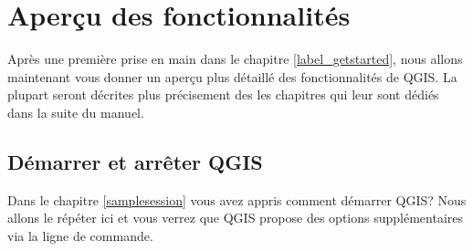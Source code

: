 
\section{Aperçu des fonctionnalités}\label{feature_glance}



Après une première prise en main dans le chapitre \ref{label_getstarted}, nous allons maintenant vous donner un aperçu plus détaillé des fonctionnalités de QGIS. La plupart seront décrites plus précisement des les chapitres qui leur sont dédiés dans la suite du manuel.

%

\subsection{Démarrer et arrêter QGIS}\label{label_startinqgis}

Dans le chapitre \ref{samplesession} vous avez appris comment démarrer QGIS? Nous allons le répéter ici et vous verrez que QGIS propose des options supplémentaires via la ligne de commande.


